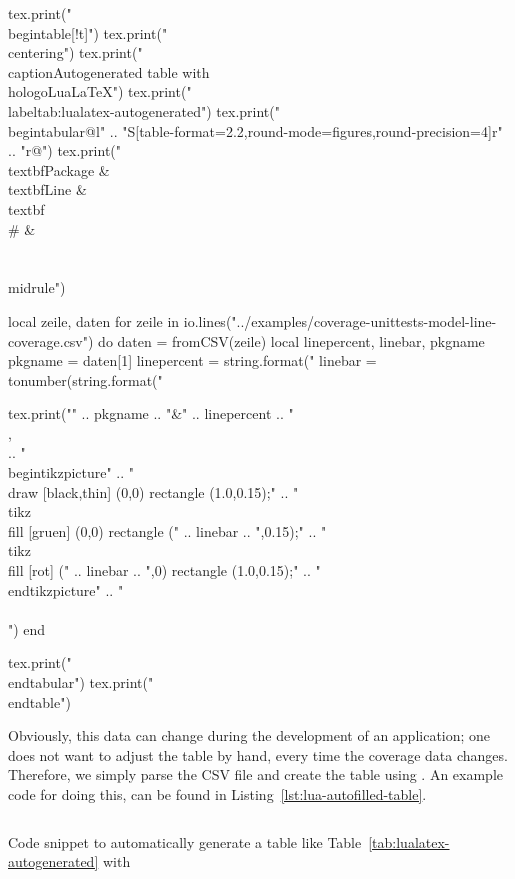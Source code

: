 \begin{luacode}
tex.print("\\begin{table}[!t]")
tex.print("\\centering")
tex.print("\\caption{Autogenerated table with \\hologo{LuaLaTeX}}")
tex.print("\\label{tab:lualatex-autogenerated}")
tex.print("\\begin{tabular}{@{}l"
  .. "S[table-format=2.2,round-mode=figures,round-precision=4]r"
  .. "r@{}}")
tex.print("\\textbf{Package} & \\textbf{Line} & \\textbf{\\#} & \\\\\\midrule")

local zeile, daten
for zeile in io.lines("../examples/coverage-unittests-model-line-coverage.csv") do
  daten = fromCSV(zeile)
  local linepercent, linebar, pkgname
  pkgname = daten[1]
  linepercent = string.format("%
  linebar = tonumber(string.format("%

  tex.print("" .. pkgname .. "&"
    .. linepercent .. "\\,\\%
    .. "\\begin{tikzpicture}"
    .. "\\draw [black,thin] (0,0) rectangle (1.0,0.15);"
    .. "\\tikz \\fill [gruen] (0,0) rectangle (" .. linebar .. ",0.15);"
    .. "\\tikz \\fill [rot] (" .. linebar .. ",0) rectangle (1.0,0.15);"
    .. "\\end{tikzpicture}"
    .. "\\\\")
end

tex.print("\\end{tabular}")
tex.print("\\end{table}")
\end{luacode}

Obviously, this data can change during the development of an application; one
does not want to adjust the table by hand, every time the coverage data changes.
Therefore, we simply parse the CSV file and create the table using
.  An example code for doing this, can be found in
Listing~\ref{lst:lua-autofilled-table}.

\begin{listing}[H]
  \inputminted[firstline=22,lastline=54]{latex}{../examples/lua-autofilled-table.tex}
  \caption{Code snippet to automatically generate a table like
    Table~\ref{tab:lualatex-autogenerated} with }
  \label{lst:lua-autofilled-table}
\end{listing}
